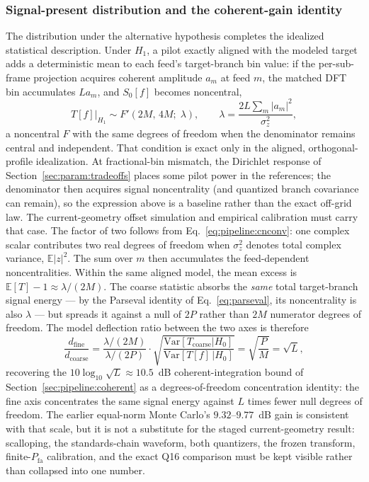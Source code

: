 \subsubsection*{Signal-present distribution and the coherent-gain identity}
The distribution under the alternative hypothesis completes the idealized statistical description. Under $H_1$, a pilot exactly aligned with the modeled target adds a deterministic mean to each feed's target-branch bin value: if the per-sub-frame projection acquires coherent amplitude $a_m$ at feed $m$, the matched DFT bin accumulates $L a_m$, and $S_0[f]$ becomes noncentral,
\begin{equation}
T[f] \big|_{H_1} \sim F'\!\left(2M, \, 4M; \; \lambda\right),
\qquad
\lambda = \frac{2 L \sum_{m} |a_m|^2}{\sigma_z^2},
\end{equation}
a noncentral $F$ with the same degrees of freedom when the denominator remains central and independent. That condition is exact only in the aligned, orthogonal-profile idealization. At fractional-bin mismatch, the Dirichlet response of Section~\ref{sec:param:tradeoffs} places some pilot power in the references; the denominator then acquires signal noncentrality (and quantized branch covariance can remain), so the expression above is a baseline rather than the exact off-grid law. The current-geometry offset simulation and empirical calibration must carry that case. The factor of two follows from Eq.~\eqref{eq:pipeline:cnconv}: one complex scalar contributes two real degrees of freedom when $\sigma_z^2$ denotes total complex variance, $\mathbb{E}|z|^2$. The sum over $m$ then accumulates the feed-dependent noncentralities. Within the same aligned model, the mean excess is $\mathbb{E}[T] - 1 \approx \lambda / (2M)$. The coarse statistic absorbs the \emph{same} total target-branch signal energy --- by the Parseval identity of Eq.~\eqref{eq:parseval}, its noncentrality is also $\lambda$ --- but spreads it against a null of $2P$ rather than $2M$ numerator degrees of freedom. The model deflection ratio between the two axes is therefore
\begin{equation}
\frac{d_{\text{fine}}}{d_{\text{coarse}}}
= \frac{\lambda/(2M)}{\lambda/(2P)} \cdot
\sqrt{\frac{\mathrm{Var}[T_{\text{coarse}}|H_0]}{\mathrm{Var}[T[f]\,|H_0]}}
= \sqrt{\frac{P}{M}} = \sqrt{L},
\end{equation}
recovering the $10 \log_{10} \sqrt{L} \approx 10.5$~dB coherent-integration bound of Section~\ref{sec:pipeline:coherent} as a degrees-of-freedom concentration identity: the fine axis concentrates the same signal energy against $L$ times fewer null degrees of freedom.  The earlier equal-norm Monte Carlo's $9.32$--$9.77$~dB gain is consistent with that scale, but it is not a substitute for the staged current-geometry result: scalloping, the standards-chain waveform, both quantizers, the frozen transform, finite-$P_{\text{fa}}$ calibration, and the exact Q16 comparison must be kept visible rather than collapsed into one number.

